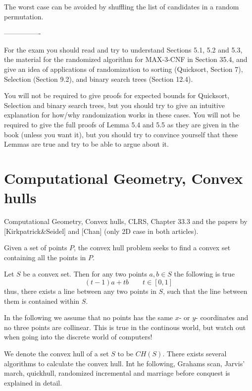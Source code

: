 \documentclass[10pt]{article}
\begin{document}
The worst case can be avoided by shuffling the list of candidates in a random permutation.


----------------

For the exam you should read and try to understand Sections 5.1, 5.2 and 5.3, the material for the randomized algorithm for MAX-3-CNF in Section 35.4, and give an idea of applications of randomization to sorting (Quicksort, Section 7), Selection (Section 9.2), and binary search trees (Section 12.4).

You will not be required to give proofs for expected bounds for Quicksort, Selection and binary search trees, but you should try to give an intuitive explanation for how/why randomization works in these cases.
You will not be required to give the full proofs of Lemma 5.4 and 5.5 as they are given in the book (unless you want it), but you should try to convince yourself that these Lemmas are true and try to be able to argue about it. 



\section{Computational Geometry, Convex hulls} %
\label{sec:computational_geometry_convex_hulls}
Computational Geometry, Convex  hulls, CLRS,  Chapter 33.3 and the papers by [Kirkpatrick\&Seidel] and [Chan] (only 2D case in both articles).

Given a set of points $P$, the convex hull problem seeks to find a convex set containing all the points in $P$.

Let $S$ be a convex set. Then for any two points $a,b \in S$ the following is true
\begin{equation}
  (t-1)a+tb \qquad t \in [0,1]
\end{equation}
thus, there exists a line between any two points in $S$, such that the line between them is contained within $S$.

In the following we assume that no points has the same $x$- or $y$- coordinates and no three points are collinear. This is true in the continous world, but watch out when going into the discrete world of computers!

We denote the convex hull of a set $S$ to be $CH(S)$. There exists several algorithms to calculate the convex hull. Int he following, Grahams scan, Jarvis' march, quickhull, randomized incremental and marriage before conquest is explained in detail.
\end{document}

